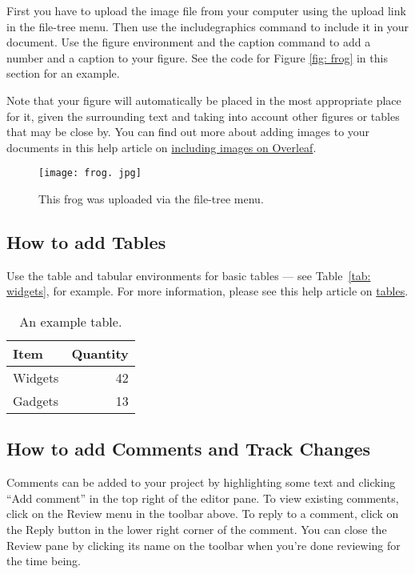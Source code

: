 \documentclass{article}
\begin{document}
First you have to upload the image file from your computer using the upload link in the file-tree menu.
 Then use the includegraphics command to include it in your document.
 Use the figure environment and the caption command to add a number and a caption to your figure.
 See the code for Figure \ref{fig:
frog} in this section for an example.


Note that your figure will automatically be placed in the most appropriate place for it,
 given the surrounding text and taking into account other figures or tables that may be close by.
 You can find out more about adding images to your documents in this help article on \href{https:
//www.
overleaf.
com/learn/how-to/Including_images_on_Overleaf}{including images on Overleaf}.


\begin{figure}
	\centering
	\texttt{[image: frog.
	jpg]}
	\caption{\label{fig:
	frog}This frog was uploaded via the file-tree menu.
	}
\end{figure}





\subsection{How to add Tables}

Use the table and tabular environments for basic tables --- see Table~\ref{tab:
widgets},
 for example.
 For more information,
 please see this help article on \href{https:
//www.
overleaf.
com/learn/latex/tables}{tables}.
 

\begin{table}
	\centering
	\begin{tabular}{l|r}
		Item & Quantity \\\hline
		Widgets & 42 \\
		Gadgets & 13
	\end{tabular}
	\caption{\label{tab:
	widgets}An example table.
	}
\end{table}





\subsection{How to add Comments and Track Changes}

Comments can be added to your project by highlighting some text and clicking ``Add comment'' in the top right of the editor pane.
 To view existing comments,
 click on the Review menu in the toolbar above.
 To reply to a comment,
 click on the Reply button in the lower right corner of the comment.
 You can close the Review pane by clicking its name on the toolbar when you're done reviewing for the time being.
\end{document}

